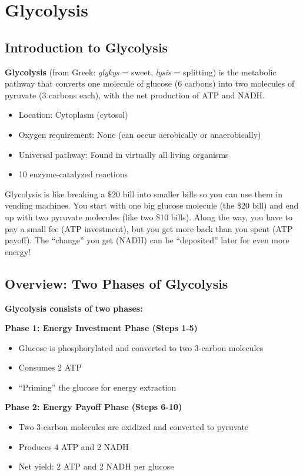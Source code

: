 \section{Glycolysis}

\subsection{Introduction to Glycolysis}

\begin{definition}
\textbf{Glycolysis} (from Greek: \textit{glykys} = sweet, \textit{lysis} = splitting) is the metabolic pathway that converts one molecule of glucose (6 carbons) into two molecules of pyruvate (3 carbons each), with the net production of ATP and NADH.
\end{definition}

\begin{itemize}
    \item Location: Cytoplasm (cytosol)
    \item Oxygen requirement: None (can occur aerobically or anaerobically)
    \item Universal pathway: Found in virtually all living organisms
    \item 10 enzyme-catalyzed reactions
\end{itemize}

\begin{analogy}
Glycolysis is like breaking a $\$20$ bill into smaller bills so you can use them in vending machines. You start with one big glucose molecule (the \$20 bill) and end up with two pyruvate molecules (like two \$10 bills). Along the way, you have to pay a small fee (ATP investment), but you get more back than you spent (ATP payoff). The ``change'' you get (NADH) can be ``deposited'' later for even more energy!
\end{analogy}

\subsection{Overview: Two Phases of Glycolysis}

\begin{theorem}
\textbf{Glycolysis consists of two phases:}

\textbf{Phase 1: Energy Investment Phase (Steps 1-5)}
\begin{itemize}
    \item Glucose is phosphorylated and converted to two 3-carbon molecules
    \item Consumes 2 ATP
    \item ``Priming'' the glucose for energy extraction
\end{itemize}

\textbf{Phase 2: Energy Payoff Phase (Steps 6-10)}
\begin{itemize}
    \item Two 3-carbon molecules are oxidized and converted to pyruvate
    \item Produces 4 ATP and 2 NADH
    \item Net yield: 2 ATP and 2 NADH per glucose
\end{itemize}
\end{theorem}

